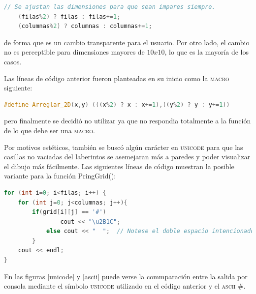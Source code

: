\documentclass[12pt,a4paper]{article}
\begin{document}
\lstset{style=mystyle}
\begin{lstlisting}[language=C++, title=Ajuste de dimensiones dentro de la función \textsf{Pedir()}, frame=single, numbers=none]
	// Se ajustan las dimensiones para que sean impares siempre.
    (filas%2) ? filas : filas+=1;
    (columnas%2) ? columnas : columnas+=1;
\end{lstlisting}

de forma que es un cambio transparente para el usuario. Por otro lado, el cambio no es perceptible para dimensiones mayores de $10x10$, lo que es la mayoría de los casos.

Las líneas de código anterior fueron planteadas en su inicio como la \textsc{macro} siguiente: 

\lstset{style=mystyle}
\begin{lstlisting}[language=C++, title=Ajuste de dimensiones dentro de la función \textsf{Pedir()}, frame=single, numbers=none]
	#define Arreglar_2D(x,y) (((x%2) ? x : x+=1),((y%2) ? y : y+=1))
\end{lstlisting}
pero finalmente se decidió no utilizar ya que no respondia totalmente a la función de lo que debe ser una \textsc{macro}.

Por motivos estéticos, también se buscó algún carácter en \textsc{unicode} para que las casillas no vaciadas del laberintos se asemejaran más a paredes y poder visualizar el dibujo más fácilmente. Las siguientes líneas de código muestran la posible variante para la función \textsf{PringGrid()}:

\lstset{style=mystyle}
\begin{lstlisting}[language=C++, title=Ajuste de dimensiones dentro de la función \textsf{Pedir()}, frame=single, numbers=none]
for (int i=0; i<filas; i++) {
    for (int j=0; j<columnas; j++){
    	if(grid[i][j] == '#')
				cout << "\u2B1C";
			else cout << "  ";  // Notese el doble espacio intencionado
		}
    cout << endl;
}
\end{lstlisting}

En las figuras \ref{unicode} y \ref{ascii} puede verse la commparación entre la salida por consola mediante el símbolo \textsc{unicode} utilizado en el código anterior y el \textsc{ascii} \#.
\end{document}
